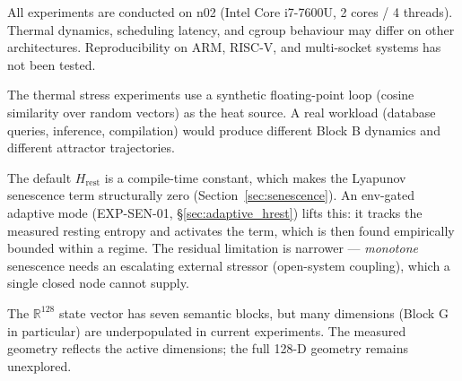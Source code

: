 \documentclass[11pt, a4paper]{article}
\newcommand{\R}{\mathbb{R}}
\begin{document}
\begin{description}[itemsep=0.55em]

  \item[Single hardware node]
    All experiments are conducted on n02 (Intel Core i7-7600U, 2 cores / 4 threads).
    Thermal dynamics, scheduling latency, and cgroup behaviour may differ
    on other architectures.
    Reproducibility on ARM, RISC-V, and multi-socket systems has not been tested.

  \item[Synthetic workload]
    The thermal stress experiments use a synthetic floating-point loop
    (cosine similarity over random vectors) as the heat source.
    A real workload (database queries, inference, compilation) would
    produce different Block B dynamics and different attractor trajectories.

  \item[Entropy ceiling: from constant to adaptive]
    The default $H_\text{rest}$ is a compile-time constant, which makes the
    Lyapunov senescence term structurally zero (Section~\ref{sec:senescence}).
    An env-gated adaptive mode (EXP-SEN-01, \S\ref{sec:adaptive_hrest}) lifts
    this: it tracks the measured resting entropy and activates the term, which
    is then found empirically bounded within a regime. The residual limitation
    is narrower --- \emph{monotone} senescence needs an escalating external
    stressor (open-system coupling), which a single closed node cannot supply.

  \item[State vector dimensionality]
    The $\R^{128}$ state vector has seven semantic blocks, but many
    dimensions (Block G in particular) are underpopulated in current
    experiments.
    The measured geometry reflects the active dimensions; the full 128-D
    geometry remains unexplored.


\end{description}
\end{document}
